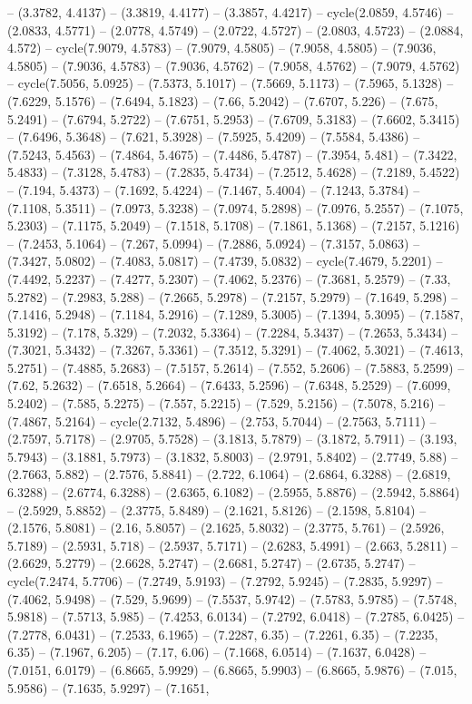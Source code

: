 -- (3.3782, 4.4137) -- (3.3819, 4.4177) -- (3.3857, 4.4217) -- cycle(2.0859, 4.5746) -- (2.0833, 4.5771) -- (2.0778, 4.5749) -- (2.0722, 4.5727) -- (2.0803, 4.5723) -- (2.0884, 4.572) -- cycle(7.9079, 4.5783) -- (7.9079, 4.5805) -- (7.9058, 4.5805) -- (7.9036, 4.5805) -- (7.9036, 4.5783) -- (7.9036, 4.5762) -- (7.9058, 4.5762) -- (7.9079, 4.5762) -- cycle(7.5056, 5.0925) -- (7.5373, 5.1017) -- (7.5669, 5.1173) -- (7.5965, 5.1328) -- (7.6229, 5.1576) -- (7.6494, 5.1823) -- (7.66, 5.2042) -- (7.6707, 5.226) -- (7.675, 5.2491) -- (7.6794, 5.2722) -- (7.6751, 5.2953) -- (7.6709, 5.3183) -- (7.6602, 5.3415) -- (7.6496, 5.3648) -- (7.621, 5.3928) -- (7.5925, 5.4209) -- (7.5584, 5.4386) -- (7.5243, 5.4563) -- (7.4864, 5.4675) -- (7.4486, 5.4787) -- (7.3954, 5.481) -- (7.3422, 5.4833) -- (7.3128, 5.4783) -- (7.2835, 5.4734) -- (7.2512, 5.4628) -- (7.2189, 5.4522) -- (7.194, 5.4373) -- (7.1692, 5.4224) -- (7.1467, 5.4004) -- (7.1243, 5.3784) -- (7.1108, 5.3511) -- (7.0973, 5.3238) -- (7.0974, 5.2898) -- (7.0976, 5.2557) -- (7.1075, 5.2303) -- (7.1175, 5.2049) -- (7.1518, 5.1708) -- (7.1861, 5.1368) -- (7.2157, 5.1216) -- (7.2453, 5.1064) -- (7.267, 5.0994) -- (7.2886, 5.0924) -- (7.3157, 5.0863) -- (7.3427, 5.0802) -- (7.4083, 5.0817) -- (7.4739, 5.0832) -- cycle(7.4679, 5.2201) -- (7.4492, 5.2237) -- (7.4277, 5.2307) -- (7.4062, 5.2376) -- (7.3681, 5.2579) -- (7.33, 5.2782) -- (7.2983, 5.288) -- (7.2665, 5.2978) -- (7.2157, 5.2979) -- (7.1649, 5.298) -- (7.1416, 5.2948) -- (7.1184, 5.2916) -- (7.1289, 5.3005) -- (7.1394, 5.3095) -- (7.1587, 5.3192) -- (7.178, 5.329) -- (7.2032, 5.3364) -- (7.2284, 5.3437) -- (7.2653, 5.3434) -- (7.3021, 5.3432) -- (7.3267, 5.3361) -- (7.3512, 5.3291) -- (7.4062, 5.3021) -- (7.4613, 5.2751) -- (7.4885, 5.2683) -- (7.5157, 5.2614) -- (7.552, 5.2606) -- (7.5883, 5.2599) -- (7.62, 5.2632) -- (7.6518, 5.2664) -- (7.6433, 5.2596) -- (7.6348, 5.2529) -- (7.6099, 5.2402) -- (7.585, 5.2275) -- (7.557, 5.2215) -- (7.529, 5.2156) -- (7.5078, 5.216) -- (7.4867, 5.2164) -- cycle(2.7132, 5.4896) -- (2.753, 5.7044) -- (2.7563, 5.7111) -- (2.7597, 5.7178) -- (2.9705, 5.7528) -- (3.1813, 5.7879) -- (3.1872, 5.7911) -- (3.193, 5.7943) -- (3.1881, 5.7973) -- (3.1832, 5.8003) -- (2.9791, 5.8402) -- (2.7749, 5.88) -- (2.7663, 5.882) -- (2.7576, 5.8841) -- (2.722, 6.1064) -- (2.6864, 6.3288) -- (2.6819, 6.3288) -- (2.6774, 6.3288) -- (2.6365, 6.1082) -- (2.5955, 5.8876) -- (2.5942, 5.8864) -- (2.5929, 5.8852) -- (2.3775, 5.8489) -- (2.1621, 5.8126) -- (2.1598, 5.8104) -- (2.1576, 5.8081) -- (2.16, 5.8057) -- (2.1625, 5.8032) -- (2.3775, 5.761) -- (2.5926, 5.7189) -- (2.5931, 5.718) -- (2.5937, 5.7171) -- (2.6283, 5.4991) -- (2.663, 5.2811) -- (2.6629, 5.2779) -- (2.6628, 5.2747) -- (2.6681, 5.2747) -- (2.6735, 5.2747) -- cycle(7.2474, 5.7706) -- (7.2749, 5.9193) -- (7.2792, 5.9245) -- (7.2835, 5.9297) -- (7.4062, 5.9498) -- (7.529, 5.9699) -- (7.5537, 5.9742) -- (7.5783, 5.9785) -- (7.5748, 5.9818) -- (7.5713, 5.985) -- (7.4253, 6.0134) -- (7.2792, 6.0418) -- (7.2785, 6.0425) -- (7.2778, 6.0431) -- (7.2533, 6.1965) -- (7.2287, 6.35) -- (7.2261, 6.35) -- (7.2235, 6.35) -- (7.1967, 6.205) -- (7.17, 6.06) -- (7.1668, 6.0514) -- (7.1637, 6.0428) -- (7.0151, 6.0179) -- (6.8665, 5.9929) -- (6.8665, 5.9903) -- (6.8665, 5.9876) -- (7.015, 5.9586) -- (7.1635, 5.9297) -- (7.1651, 
